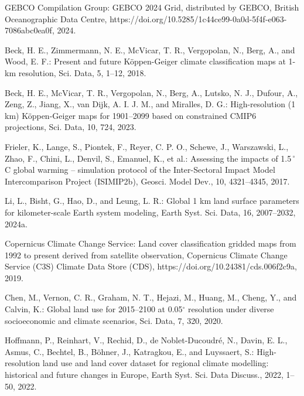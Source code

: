 \begin{thebibliography}{}
GEBCO Compilation Group: GEBCO 2024 Grid, distributed by GEBCO, British
Oceanographic Data Centre,
https://doi.org/10.5285/1c44ce99-0a0d-5f4f-e063-7086abc0ea0f, 2024.

Beck, H. E., Zimmermann, N. E., McVicar, T. R., Vergopolan, N., Berg, A., and
Wood, E. F.: Present and future K{\"o}ppen-Geiger climate classification maps
at 1-km resolution, Sci. Data, 5, 1--12, 2018.

Beck, H. E., McVicar, T. R., Vergopolan, N., Berg, A., Lutsko, N. J., Dufour,
A., Zeng, Z., Jiang, X., van Dijk, A. I. J. M., and Miralles, D. G.:
High-resolution (1 km) K{\"o}ppen-Geiger maps for 1901--2099 based on
constrained CMIP6 projections, Sci. Data, 10, 724, 2023.

Frieler, K., Lange, S., Piontek, F., Reyer, C. P. O., Schewe, J., Warszawski,
L., Zhao, F., Chini, L., Denvil, S., Emanuel, K., et al.: Assessing the impacts
of 1.5\,$^\circ$C global warming -- simulation protocol of the Inter-Sectoral
Impact Model Intercomparison Project (ISIMIP2b), Geosci. Model Dev., 10,
4321--4345, 2017.

Li, L., Bisht, G., Hao, D., and Leung, L. R.: Global 1 km land surface
parameters for kilometer-scale Earth system modeling, Earth Syst. Sci. Data,
16, 2007--2032, 2024a.


Copernicus Climate Change Service: Land cover classification gridded maps from
1992 to present derived from satellite observation, Copernicus Climate Change
Service (C3S) Climate Data Store (CDS),
https://doi.org/10.24381/cds.006f2c9a, 2019.

Chen, M., Vernon, C. R., Graham, N. T., Hejazi, M., Huang, M., Cheng, Y., and
Calvin, K.: Global land use for 2015--2100 at 0.05$^\circ$ resolution under
diverse socioeconomic and climate scenarios, Sci. Data, 7, 320, 2020.

Hoffmann, P., Reinhart, V., Rechid, D., de Noblet-Ducoudr{\'e}, N., Davin,
E. L., Asmus, C., Bechtel, B., B{\"o}hner, J., Katragkou, E., and Luyssaert,
S.: High-resolution land use and land cover dataset for regional climate
modelling: historical and future changes in Europe, Earth Syst. Sci. Data
Discuss., 2022, 1--50, 2022.


\end{thebibliography}
